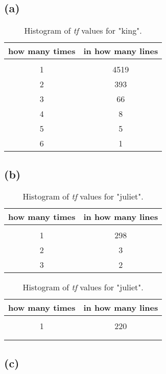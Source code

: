 \documentclass{article} %
\begin{document}
\subsection*{(a)}

\begin{table}[!htbp]
\caption{Histogram of \textit{tf} values for "king".}
\label{table:4}
\begin{center}
\begin{tabular}{c c}
\multicolumn{1}{c}{\bf how many times} & \multicolumn{1}{c}{\bf in how many lines}
\\ \hline \\
1 & 4519\\
2 & 393\\
3 & 66\\
4 & 8\\
5 & 5\\
6 & 1
\end{tabular}
\end{center}
\end{table}

\subsection*{(b)}

\begin{table}[!htbp]
\parbox{.47\linewidth}{
\caption{Histogram of \textit{tf} values for "macbeth".}
\label{table:5}
\centering
\begin{tabular}{c c}
\multicolumn{1}{c}{\bf how many times} & \multicolumn{1}{c}{\bf in how many lines}
\\ \hline \\
1 & 298\\
2 & 3\\
3 & 2
\end{tabular}
}
\hfill
\parbox{.47\linewidth}{
\caption{Histogram of \textit{tf} values for "juliet".}
\label{table:6}
\centering
\begin{tabular}{c c}
\multicolumn{1}{c}{\bf how many times} & \multicolumn{1}{c}{\bf in how many lines}
\\ \hline \\
1 & 220\\
{} & {}\\
{} & {}
\end{tabular}
}
\end{table}

\subsection*{(c)}
\end{document}
